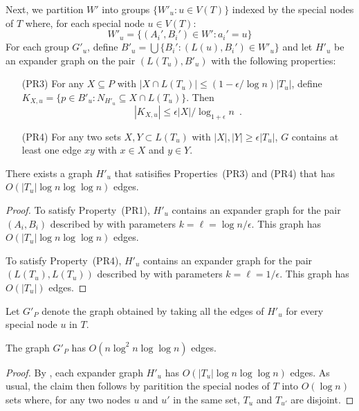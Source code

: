 \documentclass{patmorin}
\begin{document}
Next, we partition $W'$ into groups $\{W'_u: u\in V(T)\}$ indexed by
the special nodes of $T$ where, for each special node $u\in V(T)$:
\[
	W'_u = \{ (A_i',B_i')\in W' : a_i' = u \}
\]
For each group $G'_u$, define $B'_u=\bigcup\{B_i' : (L(u),B_i')\in W'_u\}$
and let $H'_u$ be an expander graph on the pair $(L(T_u), B'_u)$ with
the following properties:
\begin{enumerate}
  \item[(PR3)] For any $X\subseteq P$ with $|X\cap L(T_u)|\le
  (1-\epsilon/\log n)|T_u|$, define $K_{X,u}=\{p\in B'_u:
  N_{H'_u}\subseteq X\cap L(T_u)\}$.  Then
   \[  |K_{X,u}|\le \epsilon|X|/\log_{1+\epsilon} n \enspace . \]

  \item[(PR4)] For any two sets $X,Y\subset L(T_u)$ with $|X|,|Y|\ge
  \epsilon|T_u|$, $G$ contains at least one edge $xy$ with $x\in X$
  and $y\in Y$.
\end{enumerate}

\begin{clm}
  There exists a graph $H'_u$ that satisifies Properties~(PR3) and (PR4)
  that has $O(|T_u|\log n\log\log n)$ edges.
\end{clm}

\begin{proof}
  To satisfy Property~(PR1), $H'_u$ contains an expander graph for the
  pair $(A_i,B_i)$ described by  with parameters
  $k=\ell=\log n/\epsilon$.  This graph has $O(|T_u|\log n\log\log n)$
  edges.

  To satisfy Property~(PR4), $H'_u$ contains an expander graph for the
  pair $(L(T_u),L(T_u))$ described by  with parameters
  $k=\ell=1/\epsilon$.  This graph has $O(|T_u|)$ edges.
\end{proof}

Let $G'_P$ denote the graph obtained by taking all the edges of $H'_u$
for every special node $u$ in $T$.

\begin{clm}
  The graph $G'_P$ has $O(n\log^2 n\log\log n)$ edges.
\end{clm}

\begin{proof}
  By , each expander graph $H'_u$ has $O(|T_u|\log
  n\log\log n)$ edges.  As usual, the claim then follows by paritition the
  special nodes of $T$ into $O(\log n)$ sets where, for any two nodes $u$
  and $u'$ in the same set, $T_u$ and $T_{u'}$ are disjoint.
\end{proof}
\end{document}
